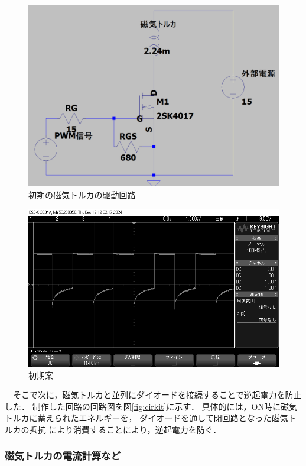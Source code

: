 \begin{figure}[H]
	\centering
		\includegraphics[scale=0.3]{./figure/回路図1.png}
		\caption{初期の磁気トルカの駆動回路}
		\label{fig:cirkit1}
\end{figure}

\begin{figure}[H]
	\centering
		\includegraphics[scale=0.3]{./figure/scope_5.png}
		\caption{初期案}
		\label{fig:osiro1}
\end{figure}


　そこで次に，磁気トルカと並列にダイオードを接続することで逆起電力を防止した．
制作した回路の回路図を図\ref{fig:cirkit}に示す．
具体的には，ON時に磁気トルカに蓄えられたエネルギーを，
ダイオードを通して閉回路となった磁気トルカの抵抗
により消費することにより，逆起電力を防ぐ．

\subsubsection{磁気トルカの電流計算など}

